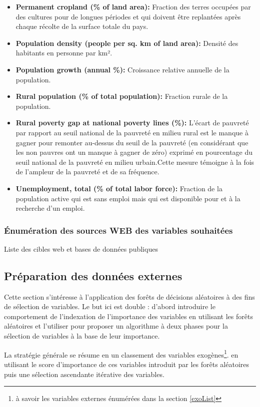 \begin{itemize}
		\item \textbf{ Permanent cropland (\% of land area):} Fraction des terres occupées par des cultures pour de longues périodes et qui doivent être replantées après chaque récolte de la surface totale du pays.
		\item \textbf{ Population density (people per sq. km of land area):} Densité des habitants en personne par km².
		\item \textbf{ Population growth (annual \%):} Croissance relative annuelle de la population.
		\item \textbf{ Rural population (\% of total population):} Fraction rurale de la population.
		\item \textbf{ Rural poverty gap at national poverty lines (\%):} L'écart de pauvreté par rapport au seuil national de la pauvreté en milieu rural est le manque à gagner pour remonter au-dessus du seuil de la pauvreté (en considérant que les non pauvres ont un manque à gagner de zéro) exprimé en pourcentage du seuil national de la pauvreté en milieu urbain.Cette mesure témoigne à la fois de l'ampleur de la pauvreté et de sa fréquence.
		\item \textbf{ Unemployment, total (\% of total labor force):} Fraction de la population active qui est sans emploi mais qui est disponible pour et à la recherche d'un emploi.
		\end{itemize}
	\subsubsection{Énumération des sources WEB des variables souhaitées}
	\par
	\begin{Huge}{ Liste des cibles  web et bases de données publiques}
		\end{Huge}

	\subsection{Préparation des données externes}
	Cette section s’intéresse à l'application des forêts de décisions aléatoires à des fins de sélection de variables. Le but ici est double : d'abord introduire le comportement de l'indexation de l'importance des variables en utilisant les forêts aléatoires et l'utiliser pour proposer un algorithme à deux phases pour la sélection de variables à la base de leur importance.\par
	La stratégie générale se résume en un classement des variables exogènes\footnote{à savoir les variables externes énumérées dans la section \ref{exoList}}. en utilisant le score d'importance de ces variables introduit par les forêts aléatoires puis une sélection ascendante itérative des variables.
